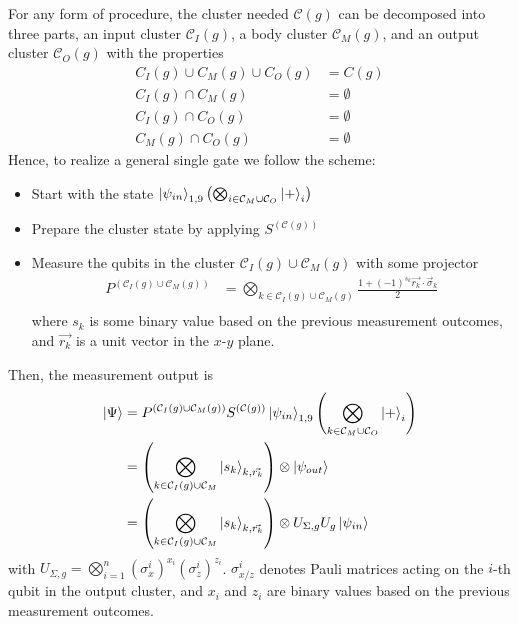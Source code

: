 \documentclass[twocolumn,secnumarabic,amssymb, nobibnotes, aps, prd]{revtex4-2}
\begin{document}
For any form of procedure, the cluster needed $\mathcal{C}(g)$ can be decomposed into three parts, an input cluster $\mathcal{C}_I(g)$, a body cluster $\mathcal{C}_M(g)$, and an output cluster $\mathcal{C}_O(g)$ with the properties
\begin{align*}
    C_I(g) \cup C_M(g) \cup C_O(g) &= C(g)\\
    C_I(g) \cap C_M(g) &= \emptyset\\
    C_I(g) \cap C_O(g) &= \emptyset\\
    C_M(g) \cap C_O(g) &= \emptyset
\end{align*}
Hence, to realize a general single gate we follow the scheme:
\begin{itemize}
    \item Start with the state $\ket{\psi_{in}}_{1,9}\left(\bigotimes_{i\in\mathcal{C}_M \cup \mathcal{C}_O}\ket{+}_i\right)$
    \item Prepare the cluster state by applying $S^{(\mathcal{C}(g))}$
    \item Measure the qubits in the cluster $\mathcal{C}_I(g) \cup \mathcal{C}_M(g)$ with some projector 
        \begin{align*}
            P^{(\mathcal{C}_I(g) \cup \mathcal{C}_M(g))} &= \bigotimes_{k\in\mathcal{C}_I(g) \cup \mathcal{C}_M(g)} \frac{1 + (-1)^{s_k}\vec{r_k}\cdot\vec{\sigma}_k}{2}\\
        \end{align*}
    where $s_k$ is some binary value based on the previous measurement outcomes, and $\vec{r_k}$ is a unit vector in the $x$-$y$ plane.
\end{itemize}
Then, the measurement output is
\begin{align*}
    \ket{\Psi}&= P^{(\mathcal{C}_I(g) \cup \mathcal{C}_M(g))} S^{(\mathcal{C}(g))} \ket{\psi_{in}}_{1,9}\left(\bigotimes_{k\in\mathcal{C}_M \cup \mathcal{C}_O}\ket{+}_i\right)\\
    &= \left(\bigotimes_{k\in\mathcal{C}_I(g)\cup\mathcal{C}_M} \ket{s_k}_{k, \vec{r_k}}\right)\otimes \ket{\psi_{out}}\\
    &= \left(\bigotimes_{k\in\mathcal{C}_I(g)\cup\mathcal{C}_M} \ket{s_k}_{k, \vec{r_k}}\right)\otimes U_{\Sigma, g} U_g\ket{\psi_{in}}
\end{align*}
with $U_{\Sigma, g} = \bigotimes_{i = 1}^{n} \left(\sigma_x^{i}\right)^{x_i}\left(\sigma_z^{i}\right)^{z_i}$. $\sigma_{x/z}^{i}$ denotes Pauli matrices acting on the $i$-th qubit in the output cluster, and $x_i$ and $z_i$ are binary values based on the previous measurement outcomes.\par
\end{document}
